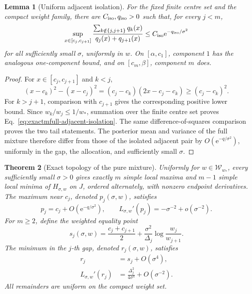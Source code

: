 \documentclass{iopjournal}
\newcommand{\e}{\mathrm e}
\theoremstyle{plain}
\newtheorem{theorem}{Theorem}
\newtheorem{lemma}[theorem]{Lemma}
\theoremstyle{definition}
\begin{document}
\begin{lemma}[Uniform adjacent isolation]
\label{lem:exactmfull-adjacent-isolation}
For the fixed finite centre set and the compact weight family, there are
\(C_{\rm iso},q_{\rm iso}>0\) such that, for every \(j<m\),
\begin{equation}
 \sup_{x\in[c_j,c_{j+1}]}
 \frac{\sum_{k\notin\{j,j+1\}}q_k(x)}
      {q_j(x)+q_{j+1}(x)}
 \le C_{\rm iso}\e^{-q_{\rm iso}/\sigma^2}
 \label{eq:exactmfull-adjacent-isolation}
\end{equation}
for all sufficiently small \(\sigma\), uniformly in \(w\).  On
\([\alpha,c_1]\), component \(1\) has the analogous one-component bound, and
on \([c_m,\beta]\), component \(m\) does.
\end{lemma}

\begin{proof}
For \(x\in[c_j,c_{j+1}]\) and \(k<j\),
\begin{equation}
 (x-c_k)^2-(x-c_j)^2
 =(c_j-c_k)(2x-c_j-c_k)\ge(c_j-c_k)^2.
 \label{eq:exactmfull-left-square-comparison}
\end{equation}
For \(k>j+1\), comparison with \(c_{j+1}\) gives the corresponding positive
lower bound.  Since \(w_k/w_j\le1/w_*\), summation over the finite centre set
proves Eq.~\eqref{eq:exactmfull-adjacent-isolation}.  The same
difference-of-squares comparison proves the two tail statements.  The
posterior mean and variance of the full mixture therefore differ from those
of the isolated adjacent pair by \(O(\e^{-q/\sigma^2})\), uniformly in the
gap, the allocation, and sufficiently small \(\sigma\).
\end{proof}

\begin{theorem}[Exact topology of the pure mixture]
\label{thm:exactmfull-pure-topology}
Uniformly for \(w\in\mathcal W_{w_*}\), every sufficiently small
\(\sigma>0\) gives exactly \(m\) simple local maxima and \(m-1\) simple local
minima of \(H_{\sigma,w}\) on \(J\), ordered alternately, with nonzero
endpoint derivatives.  The maximum near \(c_j\), denoted \(p_j(\sigma,w)\),
satisfies
\begin{equation}
 p_j=c_j+O(\e^{-q/\sigma^2}),
 \qquad L_{\sigma,w}'(p_j)
 =-\sigma^{-2}+o(\sigma^{-2}).
 \label{eq:exactmfull-peak-location}
\end{equation}
For \(m\ge2\), define the weighted equality point
\begin{equation}
 s_j(\sigma,w)
 =\frac{c_j+c_{j+1}}2
  +\frac{\sigma^2}{\Delta_j}\log\frac{w_j}{w_{j+1}}.
 \label{eq:exactmfull-weighted-crossover}
\end{equation}
The minimum in the \(j\)-th gap, denoted \(r_j(\sigma,w)\), satisfies
\begin{align}
 r_j&=s_j+O(\sigma^4),
 \label{eq:exactmfull-valley-location}\\
 L_{\sigma,w}'(r_j)
 &=\frac{\Delta_j^2}{4\sigma^4}+O(\sigma^{-2}).
 \label{eq:exactmfull-valley-curvature}
\end{align}
All remainders are uniform on the compact weight set.
\end{theorem}
\end{document}
